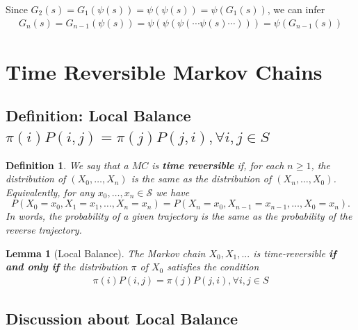 \documentclass[11pt,a4paper]{article}
\newtheorem{definition}{Definition}
\newtheorem{lemma}{Lemma}
\begin{document}
Since $G_2(s)=G_1(\psi(s))=\psi(\psi(s))=\psi(G_1(s))$, we can infer
\begin{equation}
    \begin{aligned}
        G_n(s)=G_{n-1}(\psi(s))=\psi(\psi(\psi(\cdots\psi(s)\cdots)))=\psi(G_{n-1}(s))
    \end{aligned}
    \nonumber
\end{equation}




















\section{Time Reversible Markov Chains}
\subsection{Definition: Local Balance $\pi(i)P(i,j)=\pi(j)P(j,i),\forall i,j\in S$}
\begin{definition}
    We say that a $M C$ is \textbf{time reversible} if, for each $n \geq 1$, the distribution of $\left(X_0, \ldots, X_n\right)$ is the same as the distribution of $\left(X_n, \ldots, X_0\right)$. Equivalently, for any $x_0, \ldots, x_n \in \mathcal{S}$ we have
    $$
    P\left(X_0=x_0, X_1=x_1, \ldots, X_n=x_n\right)=P\left(X_n=x_0, X_{n-1}=x_{n-1}, \ldots, X_0=x_n\right) .
    $$
    In words, the probability of a given trajectory is the same as the probability of the reverse trajectory.
\end{definition}

\begin{lemma}[Local Balance]
    The Markov chain $X_0, X_1, . . .$ is time-reversible \textbf{if and only if} the distribution $\pi$ of $X_0$ satisfies the condition
    \begin{equation}
        \begin{aligned}
            \pi(i)P(i,j)=\pi(j)P(j,i),\forall i,j\in S
        \end{aligned}
        \nonumber
    \end{equation}
\end{lemma}

\subsection{Discussion about Local Balance}
\end{document}
